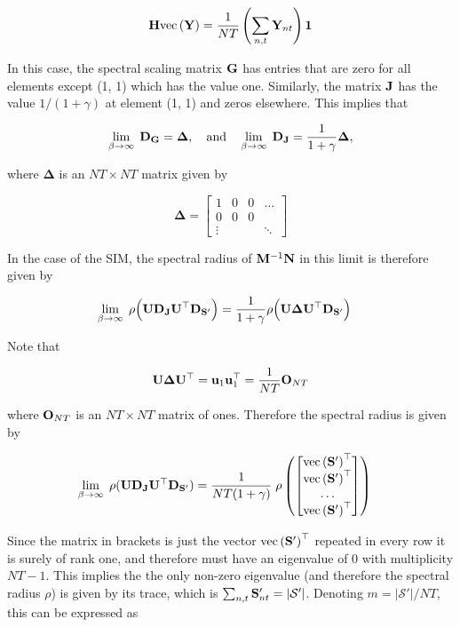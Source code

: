 $$
\mathbf{H} \text{\textup{vec}}\left(\mathbf{Y}\right) = \frac{1}{NT} \left(\sum_{n, t} \mathbf{Y}_{nt}\right) \mathbf{1}
$$


In this case, the spectral scaling matrix $\mathbf{G}$ has entries that are zero for all elements except (1, 1) which has the value one. Similarly, the matrix $\mathbf{J}$ has the value $1 / (1 + \gamma)$ at element (1, 1) and zeros elsewhere. This implies that


$$
\lim_{\beta \rightarrow \infty} \; \mathbf{D}_{\mathbf{G}} = \mathbf{\Delta}, \quad \text{and} \quad \lim_{\beta \rightarrow \infty} \; \mathbf{D}_{\mathbf{J}} = \frac{1}{1 + \gamma} \mathbf{\Delta}, 
$$

where $\mathbf{\Delta}$ is an $NT \times NT$ matrix given by

$$
\mathbf{\Delta} = \begin{bmatrix}
    1 & 0 & 0 & \dots \\
    0 & 0 & 0 &  \\
    \vdots & & & \ddots
\end{bmatrix}
$$

 In the case of the SIM, the spectral radius of $\mathbf{M}^{-1}\mathbf{N}$ in this limit is therefore given by

\begin{align*}
    \lim_{\beta \rightarrow \infty} \; \rho\Big(\mathbf{U} \mathbf{D}_{\mathbf{J}} \mathbf{U}^\top \mathbf{D}_{\mathbf{S}'} \Big) &= \frac{1}{1 + \gamma} \rho\Big(\mathbf{U} \mathbf{\Delta} \mathbf{U}^\top \mathbf{D}_{\mathbf{S}'} \Big)
\end{align*}

Note that 

\begin{equation*}
    \mathbf{U} \mathbf{\Delta} \mathbf{U}^\top = \mathbf{u}_1 \mathbf{u}_1^\top  = \frac{1}{NT} \mathbf{O}_{NT}
\end{equation*}

where $ \mathbf{O}_{NT}$ is an $NT \times NT$ matrix of ones. Therefore the spectral radius is given by 

\begin{align*}
    \lim_{\beta \rightarrow \infty} \; \rho(\mathbf{U} \mathbf{D}_{\mathbf{J}} \mathbf{U}^\top \mathbf{D}_{\mathbf{S}'}) &= \frac{1}{NT (1 + \gamma) } \; \rho \left( \begin{bmatrix}
        \text{\textup{vec}}\left(\mathbf{S}'\right)^\top \\ \text{\textup{vec}}\left(\mathbf{S}'\right)^\top \\ \dots \\ \text{\textup{vec}}\left(\mathbf{S}'\right)^\top
    \end{bmatrix} \right)
\end{align*}

Since the matrix in brackets is just the vector $\text{\textup{vec}}\left(\mathbf{S}'\right)^\top$ repeated in every row it is surely of rank one, and therefore must have an eigenvalue of 0 with multiplicity $NT - 1$. This implies the the only non-zero eigenvalue (and therefore the spectral radius $\rho$) is given by its trace, which is $\sum_{n, t}\mathbf{S}'_{nt} = |\mathcal{S}'|$. Denoting  $m=|\mathcal{S}'|/NT$, this can be expressed as 

